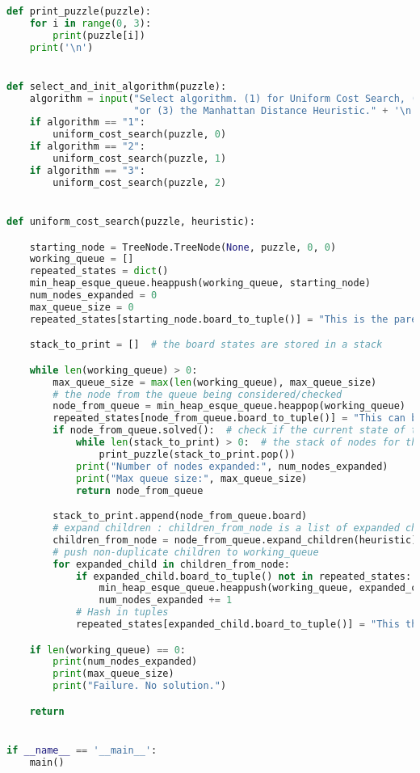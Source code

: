 \documentclass{article}
\begin{document}
\begin{lstlisting}[language=python]
def print_puzzle(puzzle):
    for i in range(0, 3):
        print(puzzle[i])
    print('\n')


def select_and_init_algorithm(puzzle):
    algorithm = input("Select algorithm. (1) for Uniform Cost Search, (2) for the Misplaced Tile Heuristic, "
                      "or (3) the Manhattan Distance Heuristic." + '\n')
    if algorithm == "1":
        uniform_cost_search(puzzle, 0)
    if algorithm == "2":
        uniform_cost_search(puzzle, 1)
    if algorithm == "3":
        uniform_cost_search(puzzle, 2)


def uniform_cost_search(puzzle, heuristic):

    starting_node = TreeNode.TreeNode(None, puzzle, 0, 0)
    working_queue = []
    repeated_states = dict()
    min_heap_esque_queue.heappush(working_queue, starting_node)
    num_nodes_expanded = 0
    max_queue_size = 0
    repeated_states[starting_node.board_to_tuple()] = "This is the parent board"

    stack_to_print = []  # the board states are stored in a stack

    while len(working_queue) > 0:
        max_queue_size = max(len(working_queue), max_queue_size)
        # the node from the queue being considered/checked
        node_from_queue = min_heap_esque_queue.heappop(working_queue)
        repeated_states[node_from_queue.board_to_tuple()] = "This can be anything"
        if node_from_queue.solved():  # check if the current state of the board is the solution
            while len(stack_to_print) > 0:  # the stack of nodes for the traceback
                print_puzzle(stack_to_print.pop())
            print("Number of nodes expanded:", num_nodes_expanded)
            print("Max queue size:", max_queue_size)
            return node_from_queue

        stack_to_print.append(node_from_queue.board)
        # expand children : children_from_node is a list of expanded children's nodes
        children_from_node = node_from_queue.expand_children(heuristic)
        # push non-duplicate children to working_queue
        for expanded_child in children_from_node:
            if expanded_child.board_to_tuple() not in repeated_states:
                min_heap_esque_queue.heappush(working_queue, expanded_child)
                num_nodes_expanded += 1
            # Hash in tuples
            repeated_states[expanded_child.board_to_tuple()] = "This the newest unique board of an expanded child"

    if len(working_queue) == 0:
        print(num_nodes_expanded)
        print(max_queue_size)
        print("Failure. No solution.")

    return


if __name__ == '__main__':
    main()

\end{lstlisting}
\end{document}
